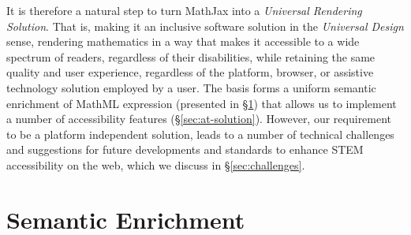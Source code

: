 \documentclass{sig-alternate}
\begin{document}
It is therefore a natural step to turn MathJax into a \emph{Universal Rendering
  Solution}. That is, making it an inclusive software solution in the
\emph{Universal Design} sense, rendering mathematics in a way that makes it
accessible to a wide spectrum of readers, regardless of their disabilities,
while retaining the same quality and user experience, regardless of the
platform, browser, or assistive technology solution employed by a user.  The
basis forms a uniform semantic enrichment of MathML expression (presented in
\S\ref{sec:semantic-enrichment}) that allows us to implement a number of
accessibility features (\S\ref{sec:at-solution}). However, our requirement to be
a platform independent solution, leads to a number of technical challenges and
suggestions for future developments and standards to enhance STEM accessibility
on the web, which we discuss in \S\ref{sec:challenges}.

\section{Semantic Enrichment}
\label{sec:semantic-enrichment}
\end{document}
